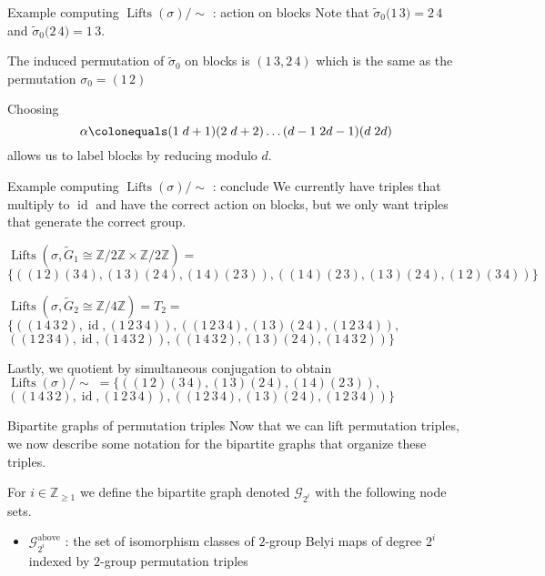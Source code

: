 \documentclass[xcolor=dvipsnames]{beamer}
\theoremstyle{plain}
\newcommand{\ZZ}{\mathbb Z}
\newcommand{\wt}[1]{\widetilde{#1}}
\DeclareMathOperator{\Lifts}{Lifts}
\DeclareMathOperator{\id}{id}
\begin{document}
{\begin{frame}{Example computing $\Lifts(\sigma)/\!\!\sim$ : action on blocks}
      Note that
      $\wt{\sigma}_0\Big(\boxed{1\,3}\Big) = \boxed{2\,4}$
      and
      $\wt{\sigma}_0\Big(\boxed{2\,4}\Big) = \boxed{1\,3}$.
      \pause\par
      The induced permutation
      of $\wt{\sigma}_0$ on blocks is
      $\left(\boxed{1\,3},\boxed{2\,4}\right)$
      which is the same as the
      permutation $\sigma_0 = (1\,2)$
      \pause\par
      Choosing
      \[
        \alpha\colonequals
        (1\;d+1)(2\;d+2)\dots
        (d-1\;2d-1)(d\;2d)
      \]
      allows us to label blocks by reducing modulo $d$.
    \end{frame}
    \begin{frame}{Example computing $\Lifts(\sigma)/\!\!\sim$ : conclude}
      We currently have triples that multiply to $\id$
      and have the correct action on blocks,
      but we only want triples that
      generate the correct group.
      \pause\par
      $\Lifts(\sigma,\wt{G}_1\cong\ZZ/2\ZZ\times\ZZ/2\ZZ)=$
      $\Big\{ ((1\,2)(3\,4), (1\,3)(2\,4), (1\,4)(2\,3)),
      ((1\,4)(2\,3), (1\,3)(2\,4), (1\,2)(3\,4)) \Big\}$
      \pause\par
      $\Lifts(\sigma,\wt{G}_2\cong\ZZ/4\ZZ)=T_2=$
      $\Big\{ ((1\,4\,3\,2), \id, (1\,2\,3\,4)),
      ((1\,2\,3\,4), (1\,3)(2\,4), (1\,2\,3\,4)),$
      $((1\,2\,3\,4), \id, (1\,4\,3\,2)),
      ((1\,4\,3\,2), (1\,3)(2\,4), (1\,4\,3\,2)) \Big\}$
      \pause\par
      Lastly, we quotient by simultaneous conjugation to obtain
      $\Lifts(\sigma)/\!\!\sim \;=\Big\{
      ((1\,2)(3\,4),(1\,3)(2\,4),(1\,4)(2\,3)),$
      $((1\,4\,3\,2),\id,(1\,2\,3\,4)),
      ((1\,2\,3\,4),(1\,3)(2\,4),(1\,2\,3\,4)) \Big\}$
    \end{frame}
    \begin{frame}{Bipartite graphs of permutation triples}
      Now that we can lift permutation triples,
      we now describe some notation for the bipartite
      graphs that organize these triples.
      \pause\par
      For $i\in\ZZ_{\geq 1}$ we define the bipartite
      graph denoted $\mathscr{G}_{2^i}$ with the following
      node sets.
      \begin{itemize}
        \item
          $\mathscr{G}_{2^i}^\text{above}$ :
          the set of isomorphism classes of $2$-group Belyi maps
          of degree $2^i$
          indexed by $2$-group permutation triples

\end{itemize}
\end{frame}}
\end{document}
